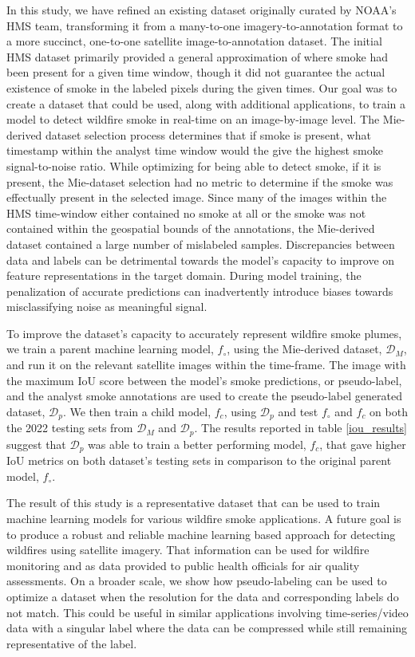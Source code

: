\documentclass{article}
\begin{document}
In this study, we have refined an existing dataset originally curated by NOAA's HMS team, transforming it from a many-to-one imagery-to-annotation format to a more succinct, one-to-one satellite image-to-annotation dataset. The initial HMS dataset primarily provided a general approximation of where smoke had been present for a given time window, though it did not guarantee the actual existence of smoke in the labeled pixels during the given times. Our goal was to create a dataset that could be used, along with additional applications, to train a model to detect wildfire smoke in real-time on an image-by-image level. The Mie-derived dataset selection process determines that if smoke is present, what timestamp within the analyst time window would the give the highest smoke signal-to-noise ratio. While optimizing for being able to detect smoke, if it is present, the Mie-dataset selection had no metric to determine if the smoke was effectually present in the selected image. Since many of the images within the HMS time-window either contained no smoke at all or the smoke was not contained within the geospatial bounds of the annotations, the Mie-derived dataset contained a large number of mislabeled samples. Discrepancies between data and labels can be detrimental towards the model's capacity to improve on feature representations in the target domain. During model training, the penalization of accurate predictions can inadvertently introduce biases towards misclassifying noise as meaningful signal. 

To improve the dataset's capacity to accurately represent wildfire smoke plumes, we train a parent machine learning model, \(f_{\circ}\), using the Mie-derived dataset, \(\mathcal{D}_M\), and run it on the relevant satellite images within the time-frame. The image with the maximum IoU score between the model's smoke predictions, or pseudo-label, and the analyst smoke annotations are used to create the pseudo-label generated dataset, \(\mathcal{D}_{p}\). We then train a child model, \(f_c\), using \(\mathcal{D}_{p}\) and test \(f_{\circ}\) and \(f_c\) on both the 2022 testing sets from \(\mathcal{D}_{M}\) and \(\mathcal{D}_{p}\). The results reported in table \ref{iou_results} suggest that \(\mathcal{D}_{p}\) was able to train a better performing model, \(f_c\), that gave higher IoU metrics on both dataset's testing sets in comparison to the original parent model, \(f_{\circ}\).

The result of this study is a representative dataset that can be used to train machine learning models for various wildfire smoke applications. A future goal is to produce a robust and reliable machine learning based approach for detecting wildfires using satellite imagery. That information can be used for wildfire monitoring and as data provided to public health officials for air quality assessments. On a broader scale, we show how pseudo-labeling can be used to optimize a dataset when the resolution for the data and corresponding labels do not match. This could be useful in similar applications involving time-series/video data with a singular label where the data can be compressed while still remaining representative of the label. 
\end{document}
